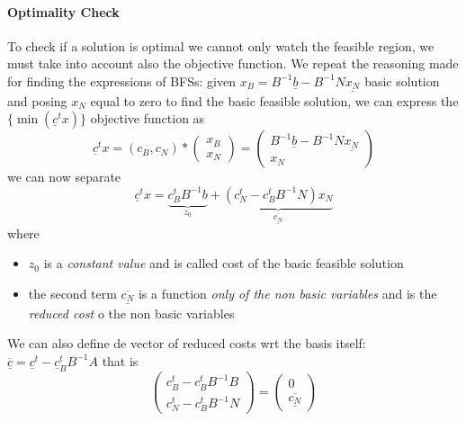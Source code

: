 \documentclass{article}
\begin{document}
				\paragraph{Optimality Check}
					To check if a solution is optimal we cannot only watch the feasible region, we must take into account also the objective function. We repeat the reasoning made for finding the expressions of BFSs: given $x_B = B^{-1}\underline{b} - B^{-1}N\underline{x_N}$ basic solution and posing $x_N$ equal to zero to find the basic feasible solution, we can express the $\{\min(\underline{c}^tx)\}$ objective function as
					\begin{equation}
						\underline{c}^tx = (c_B, c_N) * \begin{pmatrix} x_B \\ x_N \end{pmatrix} = 
							\begin{pmatrix}
								B^{-1}\underline{b} - B^{-1}N\underline{x_N} \\
								x_N
							\end{pmatrix}
					\end{equation}
					we can now separate
					\begin{equation}
						\underline{c}^tx = \underbrace{c_B^tB^{-1}b}_{z_0} + \underbrace{(c_N^t - c_B^tB^{-1}N)x_N}_{\underline{\overline{c_N}}}
					\end{equation}
					where
					\begin{itemize}
						\item $z_0$ is a \textit{constant value} and is called cost of the basic feasible solution
						\item the second term $\underline{\overline{c_N}}$ is a function \textit{only of the non basic variables} and is the \textit{reduced cost} o the non basic variables
					\end{itemize}
					We can also define de vector of reduced costs wrt the basis itself: $\underline{\overline{c}} = \underline{c}^t -\underline{c}_B^tB^{-1}A$ that is
					\begin{equation}
						\begin{pmatrix}
							c_B^t - c_B^tB^{-1}B \\
							c_N^t - c_B^tB^{-1}N
						\end{pmatrix}
						=
						\begin{pmatrix}
							0 \\
							\underline{\overline{c_N}}
						\end{pmatrix}
					\end{equation}
\end{document}
